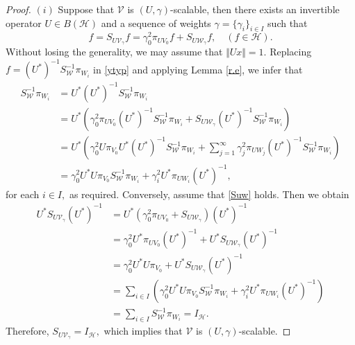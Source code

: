 \documentclass[sn-mathphys-num]{sn-jnl}%
\theoremstyle{definition}
\theoremstyle{remark}
\numberwithin{equation}{section}
\begin{document}
\begin{proof}
$(i)$ Suppose that $\mathcal{V}$ is $(U,\gamma)$-scalable, then there exists an invertible operator $U\in{B(\mathcal{H})}$ and a sequence of weights $\gamma=\{\gamma_{i}\}_{i \in I}$ such that 
\begin{equation}\label{ytyp}
f=S_{U\mathcal{V}_{\gamma}}f=\gamma_{0}^{2}\pi_{UV_{0}}f+S_{U\mathcal{W}_{\gamma}}f, \quad  (f\in \mathcal {H}).
\end{equation}
Without losing the generality, we may assume that $\Vert Ux \Vert=1.$ Replacing $f=\left( U^{*}\right) ^{-1}S_{\mathcal{W}}^{-1}\pi_{W_{i}}$ in \eqref{ytyp} and applying Lemma \ref{r.e}, we infer that 
\begin{align*}
S_{\mathcal{W}}^{-1}\pi_{W_{i}}&=U^{*}\left( U^{*}\right) ^{-1}S_{\mathcal{W}}^{-1}\pi_{W_{i}}
\\&=U^{*}\left(\gamma_{0}^{2}\pi_{UV_{0}}\left( U^{*}\right) ^{-1}S_{\mathcal{W}}^{-1}\pi_{W_{i}}+S_{U\mathcal{W}_{\gamma}}\left( U^{*}\right) ^{-1}S_{\mathcal{W}}^{-1}\pi_{W_{i}} \right) 
\\&=U^{*}\left(\gamma_{0}^{2}U\pi_{V_{0}}U^{*}\left( U^{*}\right) ^{-1}S_{\mathcal{W}}^{-1}\pi_{W_{i}}+\sum_{j=1}^{\infty}\gamma_{j}^{2}\pi_{UW_{j}}\left( U^{*}\right) ^{-1}S_{\mathcal{W}}^{-1}\pi_{W_{i}} \right) 
\\&=\gamma_{0}^{2}U^{*}U\pi_{V_{0}}S_{\mathcal{W}}^{-1}\pi_{W_{i}}+\gamma_{i}^{2}U^{*}\pi_{UW_{i}}\left( U^{*}\right) ^{-1},
\end{align*}
for each $i \in I,$ as required. Conversely, assume that \eqref{Suw} holds. Then we obtain
\begin{align*}
U^{*}S_{U\mathcal{V}_{\gamma}} \left( U^{*}\right) ^{-1}&=U^{*}\left(\gamma_{0}^{2}\pi_{UV_{0}}+S_{U\mathcal{W}_{\gamma}}\right) \left( U^{*}\right) ^{-1}
\\&=\gamma_{0}^{2}U^{*}\pi_{UV_{0}}\left( U^{*}\right) ^{-1}+U^{*}S_{U\mathcal{W}_{\gamma}}\left( U^{*}\right) ^{-1}
\\&=\gamma_{0}^{2}U^{*}U\pi_{V_{0}}+U^{*}S_{U\mathcal{W}_{\gamma}}\left( U^{*}\right) ^{-1}
\\&=\sum_{i \in I}\left(\gamma_{0}^{2}U^{*}U\pi_{V_{0}}S_{\mathcal{W}}^{-1}\pi_{W_{i}}+\gamma_{i}^{2}U^{*}\pi_{UW_{i}}\left( U^{*}\right) ^{-1} \right) 
\\&=\sum_{i \in I}S_{\mathcal{W}}^{-1}\pi_{W_{i}}=I_{\mathcal{H}}.
\end{align*}
Therefore, $S_{U\mathcal{V}_{\gamma}}=I_{\mathcal{H}},$ which implies that $\mathcal{V}$ is $(U,\gamma)$-scalable.



\end{proof}
\end{document}
